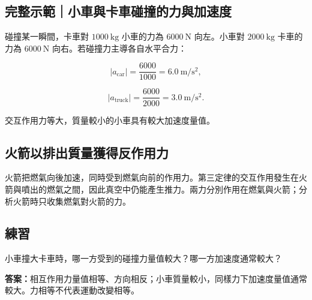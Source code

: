 \documentclass[11pt,a4paper]{article}
\begin{document}
\begin{HandoutWorkedExample}

\subsection{完整示範｜小車與卡車碰撞的力與加速度}\label{ux5b8cux6574ux793aux7bc4ux5c0fux8ecaux8207ux5361ux8ecaux78b0ux649eux7684ux529bux8207ux52a0ux901fux5ea6}

碰撞某一瞬間，卡車對 \(1000\ \mathrm{kg}\) 小車的力為 \(6000\ \mathrm N\) 向左。小車對 \(2000\ \mathrm{kg}\) 卡車的力為 \(6000\ \mathrm N\) 向右。若碰撞力主導各自水平合力：

\[
|a_{\mathrm{car}}|=\frac{6000}{1000}=6.0\ \mathrm{m/s^2},
\]

\[
|a_{\mathrm{truck}}|=\frac{6000}{2000}=3.0\ \mathrm{m/s^2}.
\]

交互作用力等大，質量較小的小車具有較大加速度量值。

\end{HandoutWorkedExample}

\subsection{火箭以排出質量獲得反作用力}\label{ux706bux7badux4ee5ux6392ux51faux8ceaux91cfux7372ux5f97ux53cdux4f5cux7528ux529b}

火箭把燃氣向後加速，同時受到燃氣向前的作用力。第三定律的交互作用發生在火箭與噴出的燃氣之間，因此真空中仍能產生推力。兩力分別作用在燃氣與火箭；分析火箭時只收集燃氣對火箭的力。

\begin{HandoutSelfCheck}

\subsection{練習}\label{ux7df4ux7fd2-4}

小車撞大卡車時，哪一方受到的碰撞力量值較大？哪一方加速度通常較大？

\textbf{答案：}相互作用力量值相等、方向相反；小車質量較小，同樣力下加速度量值通常較大。力相等不代表運動改變相等。

\end{HandoutSelfCheck}
\end{document}
